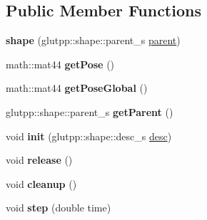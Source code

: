 \subsection*{\-Public \-Member \-Functions}
\begin{DoxyCompactItemize}
\item 
\hypertarget{classglutpp_1_1shape_1_1shape_af33c4417a03c151603a0be870fc294c6}{{\bfseries shape} (glutpp\-::shape\-::parent\-\_\-s \hyperlink{classglutpp_1_1shape_1_1parent}{parent})}\label{classglutpp_1_1shape_1_1shape_af33c4417a03c151603a0be870fc294c6}

\item 
\hypertarget{classglutpp_1_1shape_1_1shape_a437ddc67b095ec123a3aaadda7cfc7f1}{math\-::mat44 {\bfseries get\-Pose} ()}\label{classglutpp_1_1shape_1_1shape_a437ddc67b095ec123a3aaadda7cfc7f1}

\item 
\hypertarget{classglutpp_1_1shape_1_1shape_afe773d34fe5e989c65935a7c507e3106}{math\-::mat44 {\bfseries get\-Pose\-Global} ()}\label{classglutpp_1_1shape_1_1shape_afe773d34fe5e989c65935a7c507e3106}

\item 
\hypertarget{classglutpp_1_1shape_1_1shape_a4d68e601145d5e5479ec360748aa201a}{glutpp\-::shape\-::parent\-\_\-s {\bfseries get\-Parent} ()}\label{classglutpp_1_1shape_1_1shape_a4d68e601145d5e5479ec360748aa201a}

\item 
\hypertarget{classglutpp_1_1shape_1_1shape_a7d25094ffd1119b04797289d1a3da851}{void {\bfseries init} (glutpp\-::shape\-::desc\-\_\-s \hyperlink{classglutpp_1_1shape_1_1desc}{desc})}\label{classglutpp_1_1shape_1_1shape_a7d25094ffd1119b04797289d1a3da851}

\item 
\hypertarget{classglutpp_1_1shape_1_1shape_a7788abfe661a5fd92c93e2081e1d72e7}{void {\bfseries release} ()}\label{classglutpp_1_1shape_1_1shape_a7788abfe661a5fd92c93e2081e1d72e7}

\item 
\hypertarget{classglutpp_1_1shape_1_1shape_ac4c6568d96e8b0701e6c161f99e27be3}{void {\bfseries cleanup} ()}\label{classglutpp_1_1shape_1_1shape_ac4c6568d96e8b0701e6c161f99e27be3}

\item 
\hypertarget{classglutpp_1_1shape_1_1shape_a510a7f5698283d60203f3e436dbf5437}{void {\bfseries step} (double time)}\label{classglutpp_1_1shape_1_1shape_a510a7f5698283d60203f3e436dbf5437}


\end{DoxyCompactItemize}
